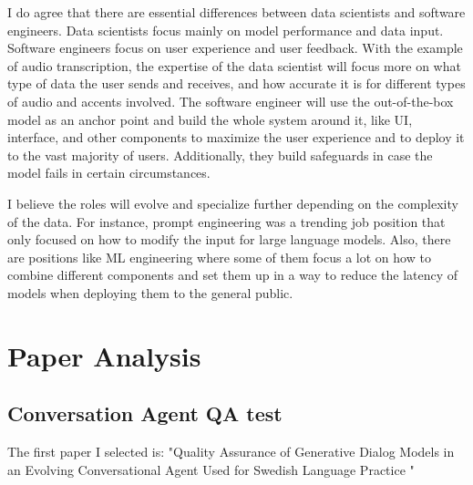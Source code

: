 \documentclass[11pt]{article}
\begin{document}
I do agree that there are essential differences between data scientists and software engineers. Data scientists focus mainly on model performance and data input. Software engineers focus on user experience and user feedback. With the example of audio transcription, the expertise of the data scientist will focus more on what type of data the user sends and receives, and how accurate it is for different types of audio and accents involved. The software engineer will use the out-of-the-box model as an anchor point and build the whole system around it, like UI, interface, and other components to maximize the user experience and to deploy it to the vast majority of users. Additionally, they build safeguards in case the model fails in certain circumstances.

I believe the roles will evolve and specialize further depending on the complexity of the data. For instance, prompt engineering was a trending job position that only focused on how to modify the input for large language models. Also, there are positions like ML engineering where some of them focus a lot on how to combine different components and set them up in a way to reduce the latency of models when deploying them to the general public.


\section{Paper Analysis}

\subsection{Conversation Agent QA test}
The first paper I selected is: "Quality Assurance of Generative Dialog Models in an Evolving
Conversational Agent Used for Swedish Language Practice \cite{qa}"
\end{document}
